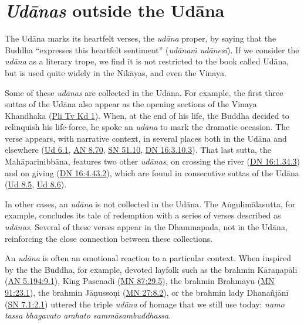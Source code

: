 \documentclass[12pt,openany]{book}%
\begin{document}
\section*{\textit{\textsanskrit{Udānas}} outside the \textsanskrit{Udāna}}

The \textsanskrit{Udāna} marks its heartfelt verses, the \textit{\textsanskrit{udāna}} proper, by saying that the Buddha “expresses this heartfelt sentiment” (\textit{\textsanskrit{udānaṁ} \textsanskrit{udānesi}}). If we consider the \textit{\textsanskrit{udāna}} as a literary trope, we find it is not restricted to the book called \textsanskrit{Udāna}, but is used quite widely in the \textsanskrit{Nikāyas}, and even the Vinaya. 

Some of these \textit{\textsanskrit{udānas}} are collected in the \textsanskrit{Udāna}. For example, the first three suttas of the \textsanskrit{Udāna} also appear as the opening sections of the Vinaya Khandhaka (\href{https://suttacentral.net/pli{-}tv{-}kd1}{Pli Tv Kd 1}). When, at the end of his life, the Buddha decided to relinquish his life-force, he spoke an \textit{\textsanskrit{udāna}} to mark the dramatic occasion. The verse appears, with narrative context, in several places both in the \textsanskrit{Udāna} and elsewhere (\href{https://suttacentral.net/ud6.1/en/sujato}{Ud 6.1}, \href{https://suttacentral.net/an8.70/en/sujato}{AN 8.70}, \href{https://suttacentral.net/sn51.10/en/sujato}{SN 51.10}, \href{https://suttacentral.net/dn16/en/sujato\#3.10.3}{DN 16:3.10.3}). That last sutta, the \textsanskrit{Mahāparinibbāna}, features two other \textit{\textsanskrit{udānas}}, on crossing the river (\href{https://suttacentral.net/dn16/en/sujato\#1.34.3}{DN 16:1.34.3}) and on giving (\href{https://suttacentral.net/dn16/en/sujato\#4.43.2}{DN 16:4.43.2}), which are found in consecutive suttas of the \textsanskrit{Udāna} (\href{https://suttacentral.net/ud8.5/en/sujato}{Ud 8.5}, \href{https://suttacentral.net/ud8.6/en/sujato}{Ud 8.6}).

In other cases, an \textit{\textsanskrit{udāna}} is not collected in the \textsanskrit{Udāna}. The \textsanskrit{Aṅgulimālasutta}, for example, concludes its tale of redemption with a series of verses described as \textit{\textsanskrit{udānas}}. Several of these verses appear in the Dhammapada, not in the \textsanskrit{Udāna}, reinforcing the close connection between these collections.

An \textit{\textsanskrit{udāna}} is often an emotional reaction to a particular context. When inspired by the the Buddha, for example, devoted layfolk such as the brahmin \textsanskrit{Kāraṇapālī}  (\href{https://suttacentral.net/an5.194/en/sujato\#9.1}{AN 5.194:9.1}), King Pasenadi (\href{https://suttacentral.net/mn87/en/sujato\#29.5}{MN 87:29.5}), the brahmin \textsanskrit{Brahmāyu} (\href{https://suttacentral.net/mn91/en/sujato\#23.1}{MN 91:23.1}), the brahmin \textsanskrit{Jāṇussoṇi} (\href{https://suttacentral.net/mn27/en/sujato\#8.2}{MN 27:8.2}), or the brahmin lady \textsanskrit{Dhanañjānī} (\href{https://suttacentral.net/sn7.1/en/sujato\#2.1}{SN 7.1:2.1}) uttered the triple \textit{\textsanskrit{udāna}} of homage that we still use today: \textit{namo tassa bhagavato arahato \textsanskrit{sammāsambuddhassa}}. 
\end{document}
